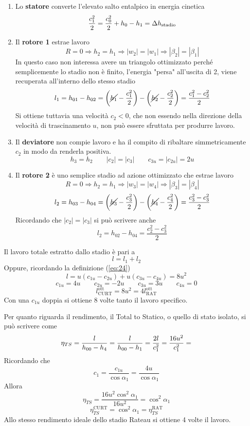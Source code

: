 \documentclass[a4paper, 15pt]{article}
\begin{document}
\begin{adjustwidth}{2in}{}		
	\begin{enumerate}
		\item Lo \textbf{statore} converte l'elevato salto entalpico in energia cinetica
		\[{c_1^2\over2} = {c_0^2\over2} + h_0-h_1 =\Delta h_{\text{stadio}} \] 
		\item Il \textbf{rotore 1} estrae lavoro 
		\[R=0\Rightarrow h_2=h_1\Rightarrow |w_2|=|w_1| \Rightarrow |\beta_2|=|\beta_1|\]
		In questo caso non interessa avere un triangolo ottimizzato perché semplicemente lo stadio non è finito, l'energia "persa" all'uscita di 2, viene recuperata all'interno dello stesso stadio
		\[l_1 = h_{01}-h_{02} = \left(\cancel{h_1}-{c_1^2\over2}\right) - \left(\cancel{h_2}-{c_2^2\over2}\right) = \dfrac{c_1^2-c_2^2}{2} \]
		Si ottiene tuttavia una velocità $c_2<0$, che non essendo nella direzione della velocità di trascinamento $u$, non può essere sfruttata per produrre lavoro.
		\item Il \textbf{deviatore} non compie lavoro e ha il compito di ribaltare simmetricamente $c_2$ in modo da renderla positiva. 
		\[h_3=h_2\qquad|c_2|=|c_3| \qquad c_{3u} = |c_{2u}| = 2u\]
		\item Il \textbf{rotore 2} è uno semplice stadio ad azione ottimizzato che estrae lavoro
		\[R=0\Rightarrow h_2=h_1\Rightarrow |w_3|=|w_4| \Rightarrow |\beta_3|=|\beta_4|\]
		\[l_2 = h_{03}-h_{04} = \left(\cancel{h_3}-{c_3^2\over2}\right) - \left(\cancel{h_4}-{c_4^2\over2}\right) = \dfrac{c_3^2-c_3^2}{2} \]
		Ricordando che $|c_2|=|c_3|$ si può scrivere anche 
		\[l_2 = h_{02}-h_{04} = \dfrac{c_2^2-c_3^2}{2} \]
	\end{enumerate}
	Il lavoro totale estratto dallo stadio è pari a
	\[l = l_1 + l_2 \]
	Oppure, ricordando la definizione (\ref{eq:24})
	\[l= u(c_{1u}-c_{2u}) + u(c_{3u}-c_{4u}) = 8u^2 \]
	\begin{equation}\label{eq:29}
	\boxed{	c_{1u}=4u\qquad c_{2u}=-2u\qquad c_{3u} =3u \qquad c_{4u}=0}
	\end{equation}
	\begin{equation}\label{eq:26}
		\boxed{l_{\text{CURT}}^{\text{ott}} = 8u^2 = 4l_{\text{RAT}}^{\text{ott}}}
	\end{equation}
	Con una $c_{1u}$ doppia si ottiene 8 volte tanto il lavoro specifico. \newline 
	
	Per quanto riguarda il rendimento, il Total to Statico, o quello di stato isolato, si può scrivere come 
	\[\eta_{TS} = \dfrac{l}{h_{00} - h_4} = \dfrac{l}{h_{00} - h_1} = {2l\over c_1^2} = {16u^2\over c_1^2} =\]
	Ricordando che 
	\[c_1 = \dfrac{c_{1u}}{\cos\alpha_1} = \dfrac{4u}{\cos\alpha_1}\]
	Allora
	\[\eta_{TS}=\dfrac{16u^2\cos^2\alpha_1}{16u^2} = \cos^2\alpha_1\]
	\begin{equation}\label{eq:27}
		\boxed{\eta_{TS}^\text{CURT} = \cos^2\alpha_1 = \eta_{TS}^\text{RAT}}
	\end{equation}
	Allo stesso rendimento ideale dello stadio Rateau si ottiene 4 volte il lavoro. \newline 
	

\end{adjustwidth}
\end{document}
